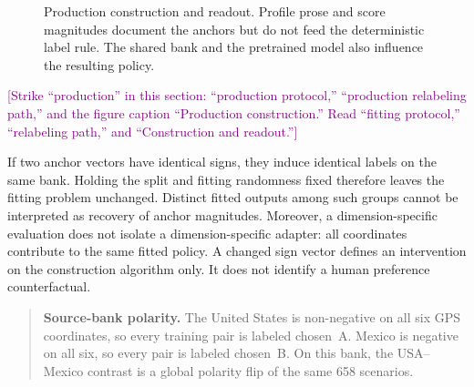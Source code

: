 \begin{figure}[htbp]
\centering
{}
\caption{Production construction and readout. Profile prose and score magnitudes document the anchors but do not feed the deterministic label rule. The shared bank and the pretrained model also influence the resulting policy.}\label{fig:pipeline}
\end{figure}

\textcolor{purple}{[Strike ``production'' in this section: ``production protocol,'' ``production relabeling path,'' and the figure caption ``Production construction.'' Read ``fitting protocol,'' ``relabeling path,'' and ``Construction and readout.'']}


If two anchor vectors have identical signs, they induce identical labels on the same bank. Holding the split and fitting randomness fixed therefore leaves the fitting problem unchanged. Distinct fitted outputs among such groups cannot be interpreted as recovery of anchor magnitudes. Moreover, a dimension-specific evaluation does not isolate a dimension-specific adapter: all coordinates contribute to the same fitted policy. A changed sign vector defines an intervention on the construction algorithm only. It does not identify a human preference counterfactual.

\begin{quote}\small
\textbf{Source-bank polarity.} The United States is non-negative on all six GPS coordinates, so every training pair is labeled chosen~A. Mexico is negative on all six, so every pair is labeled chosen~B. On this bank, the USA--Mexico contrast is a global polarity flip of the same 658 scenarios.
\end{quote}

